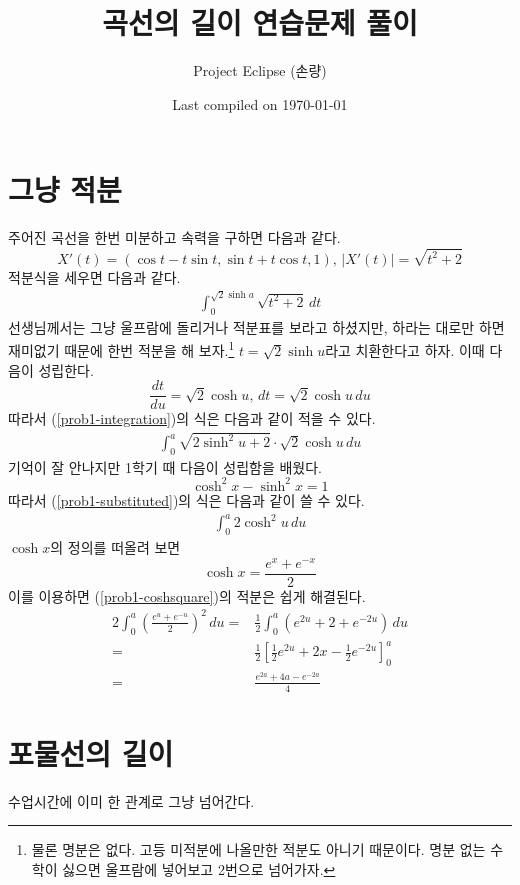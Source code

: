 \documentclass{scrartcl}
\title{곡선의 길이 연습문제 풀이}
\author{Project Eclipse (손량)}
\date{Last compiled on \today}
\begin{document}
\maketitle

\section{그냥 적분}
주어진 곡선을 한번 미분하고 속력을 구하면 다음과 같다.
\[X'(t)=(\cos t-t\sin t, \sin t+t\cos t, 1),\,|X'(t)|=\sqrt{t^2+2}\]
적분식을 세우면 다음과 같다.
\begin{align}\label{prob1-integration}
\int^{\sqrt{2}\sinh a}_0 \sqrt{t^2+2}\,dt
\end{align}
선생님께서는 그냥 울프람에 돌리거나 적분표를 보라고 하셨지만, 하라는 대로만 하면 재미없기 때문에 한번 적분을 해 보자.\footnote{물론 명분은 없다. 고등 미적분에 나올만한 적분도 아니기 때문이다. 명분 없는 수학이 싫으면 울프람에 넣어보고 2번으로 넘어가자.} \(t=\sqrt{2}\sinh u\)라고 치환한다고 하자. 이때 다음이 성립한다.
\[\frac{dt}{du}=\sqrt{2}\cosh u,\,dt=\sqrt{2}\cosh u\,du\]
따라서 (\ref{prob1-integration})의 식은 다음과 같이 적을 수 있다.
\begin{align}\label{prob1-substituted}
\int^a_0 \sqrt{2\sinh^2 u + 2}\cdot\sqrt{2}\cosh u\,du
\end{align}
기억이 잘 안나지만 1학기 때 다음이 성립함을 배웠다.
\[\cosh^2 x-\sinh^2 x=1\]
따라서 (\ref{prob1-substituted})의 식은 다음과 같이 쓸 수 있다.
\begin{align}\label{prob1-coshsquare}
\int^a_0 2\cosh^2 u\,du
\end{align}
\(\cosh x\)의 정의를 떠올려 보면
\[\cosh x=\frac{e^x+e^{-x}}{2}\]
이를 이용하면 (\ref{prob1-coshsquare})의 적분은 쉽게 해결된다.
\begin{align*}
2\int^a_0 \left( \frac{e^u+e^{-u}}{2} \right)^2\,du=&\frac{1}{2}\int^a_0 \left(e^{2u}+2+e^{-2u}\right)\,du \\
=&\frac{1}{2}\left[ \frac{1}{2}e^{2u}+2x-\frac{1}{2}e^{-2u} \right]^a_0 \\
=&\frac{e^{2a}+4a-e^{-2a}}{4}
\end{align*}

\section{포물선의 길이}
수업시간에 이미 한 관계로 그냥 넘어간다.
\end{document}
